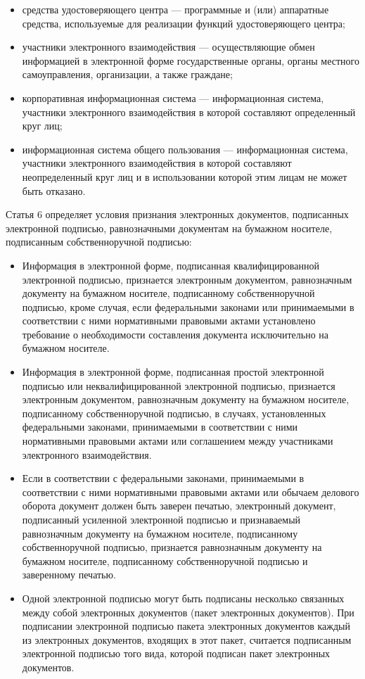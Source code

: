 \begin{itemize}
	\item средства удостоверяющего центра --- программные и (или) аппаратные средства, используемые для реализации функций удостоверяющего центра;
	\item участники электронного взаимодействия --- осуществляющие обмен информацией в электронной форме государственные органы, органы местного самоуправления, организации, а также граждане;
	\item корпоративная информационная система --- информационная система, участники электронного взаимодействия в которой составляют определенный круг лиц;
	\item информационная система общего пользования --- информационная система, участники электронного взаимодействия в которой составляют неопределенный круг лиц и в использовании которой этим лицам не может быть отказано.
\end{itemize}

\vspace{\baselineskip}
Статья 6 определяет условия признания электронных документов, подписанных электронной подписью, равнозначными документам на бумажном носителе, подписанным собственноручной подписью:
\begin{itemize}
	\item Информация в электронной форме, подписанная квалифицированной электронной подписью, признается электронным документом, равнозначным документу на бумажном носителе, подписанному собственноручной подписью, кроме случая, если федеральными законами или принимаемыми в соответствии с ними нормативными правовыми актами установлено требование о необходимости составления документа исключительно на бумажном носителе.
	\item Информация в электронной форме, подписанная простой электронной подписью или неквалифицированной электронной подписью, признается электронным документом, равнозначным документу на бумажном носителе, подписанному собственноручной подписью, в случаях, установленных федеральными законами, принимаемыми в соответствии с ними нормативными правовыми актами или соглашением между участниками электронного взаимодействия.
	\item Если в соответствии с федеральными законами, принимаемыми в соответствии с ними нормативными правовыми актами или обычаем делового оборота документ должен быть заверен печатью, электронный документ, подписанный усиленной электронной подписью и признаваемый равнозначным документу на бумажном носителе, подписанному собственноручной подписью, признается равнозначным документу на бумажном носителе, подписанному собственноручной подписью и заверенному печатью.
	\item Одной электронной подписью могут быть подписаны несколько связанных между собой электронных документов (пакет электронных документов). При подписании электронной подписью пакета электронных документов каждый из электронных документов, входящих в этот пакет, считается подписанным электронной подписью того вида, которой подписан пакет электронных документов.
\end{itemize}

